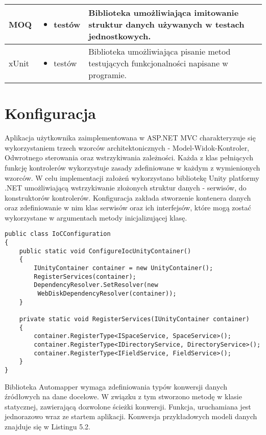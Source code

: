 \begin{center}
\begin{longtable}{ | p{2.2cm} | p{5cm} | p{6.5cm} |}
    \hline MOQ &  
    \begin{itemize} 
    	\item testów
    \end{itemize} 
    & Biblioteka umożliwiająca imitowanie struktur danych używanych w testach jednostkowych. \\ \hline
    
     \hline xUnit &  
    \begin{itemize} 
    	\item testów
    \end{itemize} 
    & Biblioteka umożliwiająca pisanie metod testujących funkcjonalności napisane w programie.  \\ \hline
	\end{longtable}
\end{center}

\newpage
\section{Konfiguracja}
Aplikacja użytkownika zaimplementowana w ASP.NET MVC charakteryzuje się wykorzystaniem trzech wzorców architektonicznych - Model-Widok-Kontroler, Odwrotnego sterowania oraz wstrzykiwania zależności. Każda z klas pełniących funkcję kontrolerów wykorzystuje zasady zdefiniowane w każdym z wymienionych wzorców. W celu implementacji założeń wykorzystano bibliotekę Unity platformy .NET umożliwiającą wstrzykiwanie złożonych struktur danych - serwisów, do konstruktorów kontrolerów. Konfiguracja zakłada stworzenie kontenera danych oraz zdefiniowanie w nim klas serwisów oraz ich interfejsów, które mogą zostać wykorzystane w argumentach metody inicjalizującej klasę.
\\

\begin{lstlisting}[caption=Konfiguracja kontenera Odwrotnego sterowania ]
public class IoCConfiguration
{
	public static void ConfigureIocUnityContainer()
	{
		IUnityContainer container = new UnityContainer();
		RegisterServices(container);
		DependencyResolver.SetResolver(new
		 WebDiskDependencyResolver(container));
	}

	private static void RegisterServices(IUnityContainer container)
	{
		container.RegisterType<ISpaceService, SpaceService>();
		container.RegisterType<IDirectoryService, DirectoryService>();
		container.RegisterType<IFieldService, FieldService>();
	}
}
\end{lstlisting}

Biblioteka Automapper wymaga zdefiniowania typów konwersji danych źródłowych na dane docelowe. W związku z tym stworzono metodę w klasie statycznej, zawierającą dozwolone ścieżki konwersji. Funkcja, uruchamiana jest jednorazowo wraz ze startem aplikacji. Konwersja przykładowych modeli danych znajduje się w Listingu 5.2. 
\newpage

